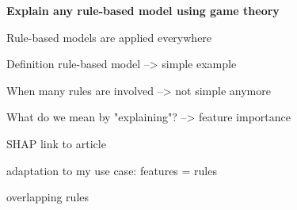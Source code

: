 {\fontsize{20pt}{30pt} \textbf{Explain any rule-based model using game theory}\par}

\vspace{10mm}

Rule-based models are applied everywhere

Definition rule-based model --> simple example

When many rules are involved --> not simple anymore

What do we mean by "explaining"? --> feature importance

SHAP 
link to article

adaptation to my use case: features = rules

overlapping rules

\vspace{10mm}